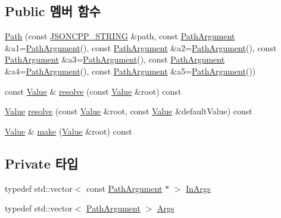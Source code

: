 \subsection*{Public 멤버 함수}
\begin{DoxyCompactItemize}
\item 
\hyperlink{class_json_1_1_path_a7356c0e9c1fc2276390fd396271c1300}{Path} (const \hyperlink{json_8h_a1e723f95759de062585bc4a8fd3fa4be}{J\+S\+O\+N\+C\+P\+P\+\_\+\+S\+T\+R\+I\+NG} \&path, const \hyperlink{class_json_1_1_path_argument}{Path\+Argument} \&a1=\hyperlink{class_json_1_1_path_argument}{Path\+Argument}(), const \hyperlink{class_json_1_1_path_argument}{Path\+Argument} \&a2=\hyperlink{class_json_1_1_path_argument}{Path\+Argument}(), const \hyperlink{class_json_1_1_path_argument}{Path\+Argument} \&a3=\hyperlink{class_json_1_1_path_argument}{Path\+Argument}(), const \hyperlink{class_json_1_1_path_argument}{Path\+Argument} \&a4=\hyperlink{class_json_1_1_path_argument}{Path\+Argument}(), const \hyperlink{class_json_1_1_path_argument}{Path\+Argument} \&a5=\hyperlink{class_json_1_1_path_argument}{Path\+Argument}())
\item 
const \hyperlink{class_json_1_1_value}{Value} \& \hyperlink{class_json_1_1_path_ad1abdc54d2e03fc0e9436c3b9fd55a33}{resolve} (const \hyperlink{class_json_1_1_value}{Value} \&root) const
\item 
\hyperlink{class_json_1_1_value}{Value} \hyperlink{class_json_1_1_path_ab65ab001ccdbc6f8b5f123da58b92539}{resolve} (const \hyperlink{class_json_1_1_value}{Value} \&root, const \hyperlink{class_json_1_1_value}{Value} \&default\+Value) const
\item 
\hyperlink{class_json_1_1_value}{Value} \& \hyperlink{class_json_1_1_path_a858f9426f0f7bbe0450644d72b44e26b}{make} (\hyperlink{class_json_1_1_value}{Value} \&root) const
\end{DoxyCompactItemize}
\subsection*{Private 타입}
\begin{DoxyCompactItemize}
\item 
typedef std\+::vector$<$ const \hyperlink{class_json_1_1_path_argument}{Path\+Argument} $\ast$ $>$ \hyperlink{class_json_1_1_path_ab29d7b2fc896c7d3c5ed4609af3a3f23}{In\+Args}
\item 
typedef std\+::vector$<$ \hyperlink{class_json_1_1_path_argument}{Path\+Argument} $>$ \hyperlink{class_json_1_1_path_a27d96232d034d7a78286468676f9cb3e}{Args}
\end{DoxyCompactItemize}
